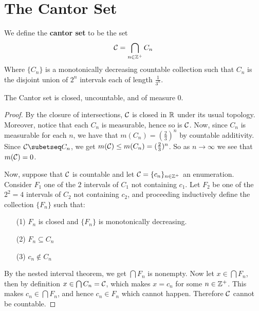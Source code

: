 \section{The Cantor Set}

\begin{definition}
    We define the \textbf{cantor set} to be the set
    \begin{equation*}
        \mathcal{C}=\bigcap_{n \in \mathbb{Z}^+}{C_n}
    \end{equation*}
    Where $\{C_n\}$ is a monotonically decreasing countable collection such that
    $C_n$ is the disjoint union of  $2^n$ intervals each of length
    $\frac{1}{3^n}$.
\end{definition}

\begin{theorem}\label{8.6.1}
    The Cantor set is closed, uncountable, and of measure $0$.
\end{theorem}
\begin{proof}
    By the closure of intersections, $\mathcal{C}$ is closed in  $\mathbb{R}$ under its usual
    topology. Moreover, notice that each  $C_n$ is measurable, hence so is
    $\mathcal{C}$. Now, since  $C_n$ is measurable for each  $n$, we have that
    $m(C_n)=(\frac{2}{3})^n$ by countable additivity. Since $\Cc \subetseq C_n$,
    we get  $m(\mathcal{C}) \leq m(C_n)=(\frac{2}{3})^n$. So as $n \xrightarrow{}
    \infty$ we see that $m(\mathcal{C})=0$.

    Now, suppose that $\mathcal{C}$ is countable and let  $\mathcal{C}=\{c_n\}_{n \in \mathbb{Z}^+}$ an
    enumeration. Consider $F_1$ one of the $2$ intervals of  $C_1$ not
    containing $c_1$. Let $F_2$ be one of the $2^2=4$ intervals of  $C_2$ not
    containing  $c_2$, and proceeding inductively define the collection
    $\{F_n\}$ such that:
    \begin{enumerate}
        \item[(1)] $F_n$ is closed and  $\{F_n\}$ is monotonically decreasing.

        \item[(2)] $F_n \subseteq C_n$

        \item[(3)] $c_n \notin C_n$
    \end{enumerate}
    By the nested interval theorem, we get $\bigcap{F_n}$ is nonempty. Now let
    $x \in \bigcap{F_n}$, then by definition $x \in \bigcap{C_n}=\mathcal{C}$, which
    makes $x=c_n$ for some  $n \in \mathbb{Z}^+$. This makes  $c_n \in \bigcap{F_n}$,
    and hence $c_n \in F_n$ which cannot happen. Therefore  $\mathcal{C}$ cannot be
    countable.
\end{proof}

